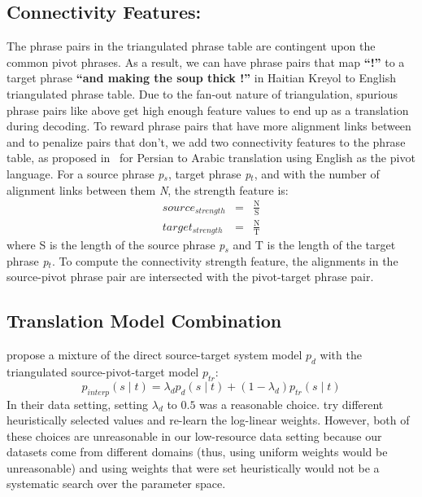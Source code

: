 \documentclass[11pt]{article}
\begin{document}
\subsection{Connectivity Features:} \label{sec:strength} The phrase pairs in the triangulated phrase table are contingent upon the common pivot phrases. As a result, we can have phrase pairs that map \textbf{``!''} to a target phrase \textbf{``and making the soup thick !''} in Haitian Kreyol to English triangulated phrase table. Due to the fan-out nature of triangulation, spurious phrase pairs like above get high enough feature values to end up as a translation during decoding. To reward phrase pairs that have more alignment links between and to penalize pairs that don't, we add two connectivity features to the phrase table, as proposed in~\cite{Ahmed:13} for Persian to Arabic translation using English as the pivot language. For a source phrase \emph{p$_s$}, target phrase \emph{p$_t$}, and with the number of alignment links between them \emph{N}, the strength feature is:
	\begin{eqnarray*}
		source_{strength} &=& \frac{\mathrm{N}}{\mathrm{S}} \\
		target_{strength} &=& \frac{\mathrm{N}}{\mathrm{T}}
	\end{eqnarray*}
	where S is the length of the source phrase \emph{p$_s$} and T is the length of the target phrase \emph{p$_t$}. To compute the connectivity strength feature, the alignments in the source-pivot phrase pair are intersected with the pivot-target phrase pair. 

\subsection{Translation Model Combination}
\label{sec:interpolation}
	\cite{Cohn:07} propose a mixture of the direct source-target system model $p_d$ with the triangulated source-pivot-target model $p_{tr}$: 
	\begin{equation} \label{eq:interpolation}
		p_{interp}(s \mid t) = \lambda_{d} p_{d}(s \mid t) + (1 - \lambda_{d}) p_{tr}(s \mid t)
	\end{equation}
	In their data setting, setting $\lambda_{d}$ to $0.5$ was a reasonable choice. \cite{Nakov:12} try different heuristically selected values and re-learn the log-linear weights. However, both of these choices are unreasonable in our low-resource data setting because our datasets come from different domains (thus, using uniform weights would be unreasonable) and using weights that were set heuristically would not be a systematic search over the parameter space. 
		
\end{document}
